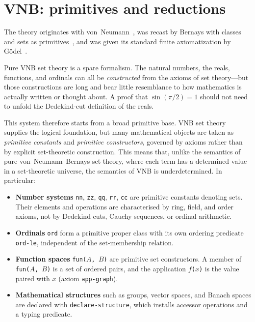 \section{VNB: primitives and reductions}
\label{sec:primitives}

The theory originates with von~Neumann~\cite{vonNeumann1925}, was recast
by Bernays with classes and sets as primitives~\cite{Bernays1937}, and was
given its standard finite axiomatization by
G\"odel~\cite{Godel1940}.

Pure VNB set theory is a spare formalism.  The natural numbers, the
reals, functions, and ordinals can all be \emph{constructed} from the
axioms of set theory---but those constructions are long and bear little
resemblance to how mathematics is actually written or thought
about.  A proof that $\sin(\pi/2) = 1$ should not need to unfold the
Dedekind-cut definition of the reals.

This system therefore starts from a broad primitive base.  VNB set
theory supplies the logical foundation, but many mathematical objects
are taken as \emph{primitive constants} and \emph{primitive
constructors}, governed by axioms rather than by explicit
set-theoretic construction.  This means that, unlike the semantics of
pure von~Neumann--Bernays set theory, where each term has a determined
value in a set-theoretic universe, the semantics of VNB is
underdetermined.  In particular:

\begin{itemize}
\item \textbf{Number systems} \texttt{nn}, \texttt{zz}, \texttt{qq},
  \texttt{rr}, \texttt{cc} are primitive constants denoting sets.  Their
  elements and operations are characterised by ring, field, and order
  axioms, not by Dedekind cuts, Cauchy sequences, or ordinal arithmetic.
\item \textbf{Ordinals} \texttt{ord} form a primitive proper class with
  its own ordering predicate \texttt{ord-le}, independent of the
  set-membership relation.
\item \textbf{Function spaces} \texttt{fun($A$, $B$)} are primitive
  set constructors.  A member of \texttt{fun($A$, $B$)} is a set of
  ordered pairs, and the application \texttt{$f$($x$)} is the value
  paired with $x$ (axiom \texttt{app-graph}).
\item \textbf{Mathematical structures} such as groups, vector spaces,
  and Banach spaces are declared with \texttt{declare-structure}, which
  installs accessor operations and a typing predicate.
\end{itemize}


